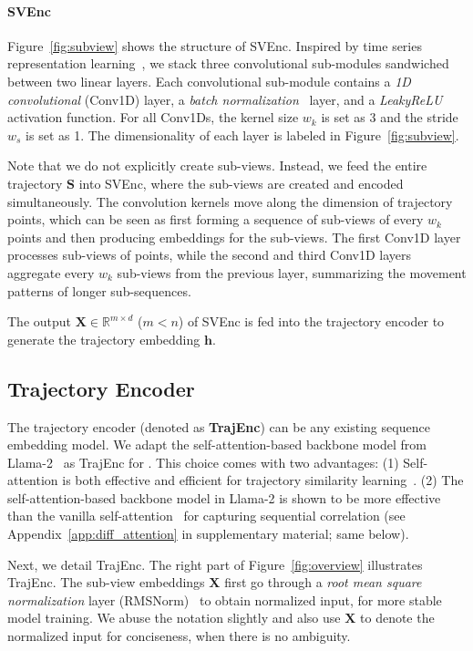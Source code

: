 \paragraph{SVEnc}
Figure~\ref{fig:subview} shows the structure of SVEnc. 
Inspired by time series representation learning~\cite{patchfy,timellm}, we stack 
three convolutional sub-modules sandwiched between two linear layers. Each convolutional sub-module contains a \emph{1D convolutional} (Conv1D) layer, a \emph{batch normalization}~\cite{batchnorm} layer, and a \emph{LeakyReLU} activation function.
For all Conv1Ds, the kernel size $w_{k}$ is set as 3 and the stride $w_{s}$ is set as 1. The dimensionality of each layer is labeled in Figure~\ref{fig:subview}. 


Note that we do not explicitly create sub-views. Instead, we feed the entire trajectory $\mathbf{S}$ into SVEnc, where the sub-views are created and encoded simultaneously.
The convolution kernels move  along the dimension of trajectory points, which can be seen as first forming a sequence of sub-views of every $w_{k}$ points and then producing embeddings for the sub-views. 
The first Conv1D layer processes sub-views of points, while the second and third Conv1D layers aggregate every $w_{k}$ sub-views from the previous layer, summarizing the movement patterns of longer sub-sequences.  

The output $\mathbf{X} \in \mathbb{R}^{m\times d}$ ($m < n$) of SVEnc  is fed into the trajectory encoder to generate the trajectory embedding $\mathbf{h}$.


\subsection{Trajectory Encoder}\label{subsec:traj_enc}
The trajectory encoder (denoted as \textbf{TrajEnc}) can be any existing sequence embedding model. 
We adapt the self-attention-based backbone model from Llama-2~\cite{llama2} as TrajEnc for  \model. This choice comes with two advantages: (1) Self-attention is both effective and efficient for trajectory similarity learning~\cite{t3s,trajsimi_survey}. 
(2) The self-attention-based backbone model in Llama-2 is shown to be more effective than the vanilla self-attention~\cite{transformer} for 
capturing sequential correlation (see  Appendix~\ref{app:diff_attention} in supplementary material; same below).


Next, we detail TrajEnc. 
The right part of Figure~\ref{fig:overview} illustrates TrajEnc.
The sub-view embeddings $\mathbf{X}$ first go through a \emph{root mean square normalization} layer (RMSNorm)~\cite{rmsnorm} to obtain normalized input, for more stable model training.
We abuse the notation slightly and also use  $\mathbf{X}$ to denote the normalized input for conciseness, when there is no ambiguity.

